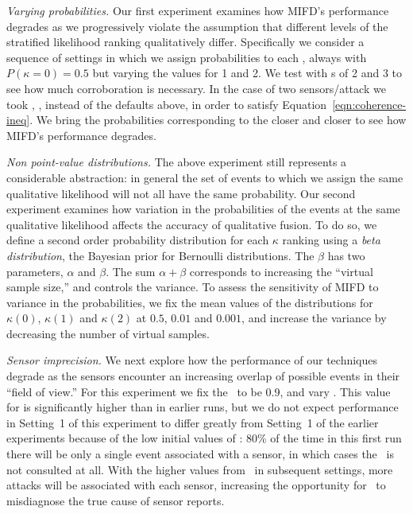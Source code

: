 \emph{Varying probabilities.}
Our first experiment examines how MIFD's performance degrades as
we progressively violate the assumption that different levels of
the stratified likelihood ranking qualitatively differ.
Specifically we consider a sequence of settings in which we assign
probabilities to each \tkappa,
always with
$P(\kappa=0)=0.5$ but varying the values for 1 and 2.
We test with \sensorToAttackRatio{}s of 2 and 3 to see how much corroboration is
necessary.  In the case of two sensors/attack we took , , 
instead of the defaults above, in order to satisfy
Equation~\ref{eqn:coherence-ineq}.
We bring the probabilities corresponding to
the \tkappas closer and closer to see how MIFD's performance degrades.

\emph{Non point-value distributions.}
The above experiment still represents a considerable abstraction:  in general
the set of events to which we assign the same qualitative likelihood will not
all have the same probability.
Our second experiment examines how variation in the probabilities of the
events at the same qualitative likelihood affects the accuracy of qualitative
fusion.
To do so, we
define a second order probability distribution
for each \(\kappa\) ranking
using a \emph{beta distribution},
the Bayesian prior for Bernoulli
distributions.
The $\beta$ has two parameters, $\alpha$ and $\beta$.
The sum $\alpha+\beta$
corresponds to increasing the
``virtual sample size,'' and controls the variance.
To assess the sensitivity of MIFD to variance in the probabilities,
we fix the mean values
of the distributions for $\kappa(0)$,
$\kappa(1)$ and $\kappa(2)$ at $0.5$, $0.01$ and $0.001$,
and increase the variance by decreasing the number of virtual samples.

\emph{Sensor imprecision.}
We next explore how the performance of our techniques degrade as the
sensors encounter an increasing overlap of possible events in their
``field of view.'' 
For this experiment we fix the \sensorOverlap\ to be 0.9, and vary
\numEventProtosDetected. This value for \sensorOverlap is
significantly higher than in earlier runs, but we do not expect
performance in Setting~1 of this experiment to differ greatly from
Setting~1 of the earlier experiments because of the low initial values of
\numEventProtosDetected:  80\% of the time in this first run there will be only a single
event associated with a sensor, in which cases the \sensorOverlap\ is
not consulted at all.  With the higher
values from \numEventProtosDetected\ in subsequent settings, more
attacks will be associated with each sensor, increasing the opportunity
for \mifd\ to misdiagnose the true cause of sensor reports.

